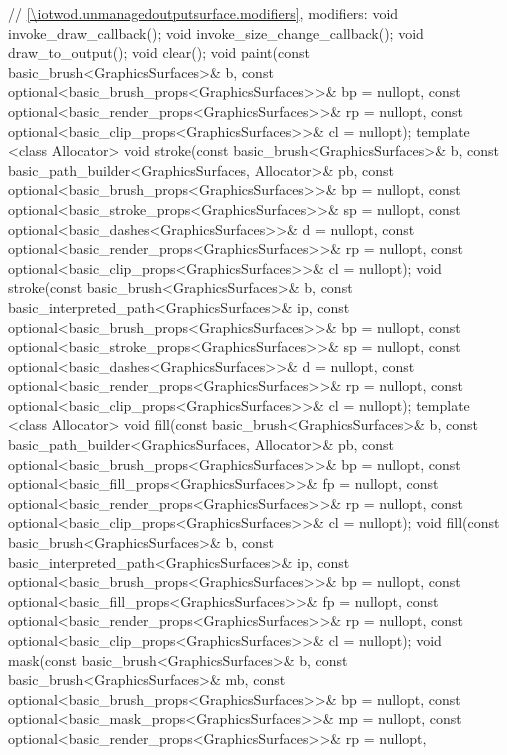\begin{codeblock}
{{    // \ref{\iotwod.unmanagedoutputsurface.modifiers}, modifiers:
    void invoke_draw_callback();
    void invoke_size_change_callback();
    void draw_to_output();
    void clear();
    void paint(const basic_brush<GraphicsSurfaces>& b,
      const optional<basic_brush_props<GraphicsSurfaces>>& bp = nullopt,
      const optional<basic_render_props<GraphicsSurfaces>>& rp = nullopt,
      const optional<basic_clip_props<GraphicsSurfaces>>& cl = nullopt);
    template <class Allocator>
    void stroke(const basic_brush<GraphicsSurfaces>& b,
      const basic_path_builder<GraphicsSurfaces, Allocator>& pb,
      const optional<basic_brush_props<GraphicsSurfaces>>& bp = nullopt,
      const optional<basic_stroke_props<GraphicsSurfaces>>& sp = nullopt,
      const optional<basic_dashes<GraphicsSurfaces>>& d = nullopt,
      const optional<basic_render_props<GraphicsSurfaces>>& rp = nullopt,
      const optional<basic_clip_props<GraphicsSurfaces>>& cl = nullopt);
    void stroke(const basic_brush<GraphicsSurfaces>& b,
      const basic_interpreted_path<GraphicsSurfaces>& ip,
      const optional<basic_brush_props<GraphicsSurfaces>>& bp = nullopt,
      const optional<basic_stroke_props<GraphicsSurfaces>>& sp = nullopt,
      const optional<basic_dashes<GraphicsSurfaces>>& d = nullopt,
      const optional<basic_render_props<GraphicsSurfaces>>& rp = nullopt,
      const optional<basic_clip_props<GraphicsSurfaces>>& cl = nullopt);
    template <class Allocator>
    void fill(const basic_brush<GraphicsSurfaces>& b,
      const basic_path_builder<GraphicsSurfaces, Allocator>& pb,
      const optional<basic_brush_props<GraphicsSurfaces>>& bp = nullopt,
      const optional<basic_fill_props<GraphicsSurfaces>>& fp = nullopt,
      const optional<basic_render_props<GraphicsSurfaces>>& rp = nullopt,
      const optional<basic_clip_props<GraphicsSurfaces>>& cl = nullopt);
    void fill(const basic_brush<GraphicsSurfaces>& b,
      const basic_interpreted_path<GraphicsSurfaces>& ip,
      const optional<basic_brush_props<GraphicsSurfaces>>& bp = nullopt,
      const optional<basic_fill_props<GraphicsSurfaces>>& fp = nullopt,
      const optional<basic_render_props<GraphicsSurfaces>>& rp = nullopt,
      const optional<basic_clip_props<GraphicsSurfaces>>& cl = nullopt);
    void mask(const basic_brush<GraphicsSurfaces>& b,
      const basic_brush<GraphicsSurfaces>& mb,
      const optional<basic_brush_props<GraphicsSurfaces>>& bp = nullopt,
      const optional<basic_mask_props<GraphicsSurfaces>>& mp = nullopt,
      const optional<basic_render_props<GraphicsSurfaces>>& rp = nullopt,
}}
\end{codeblock}
